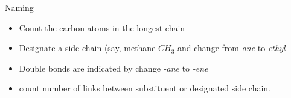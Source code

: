 \documentclass[12pt]{article}
\begin{document}
Naming
\begin{itemize}
    \item Count the carbon atoms in the longest chain
    \item Designate a side chain (say, methane $CH_{3}$ and change from \textit{ane} to \textit{ethyl}
    \item Double bonds are indicated by change \textit{-ane} to \textit{-ene}
    \item count number of links between substituent or designated side chain.
\end{itemize}
\end{document}
